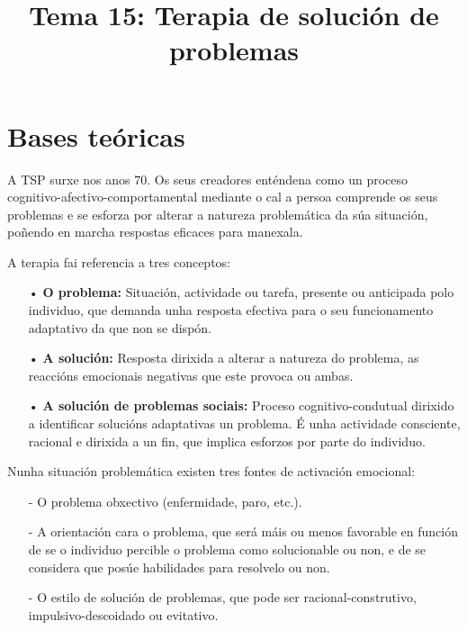 \documentclass[a4paper,11pt]{article}
\title{Tema 15: Terapia de solución de problemas}
\date{}
\begin{document}
   

\maketitle 

\section{Bases teóricas}
A TSP surxe nos anos 70. Os seus creadores enténdena como un proceso cognitivo-afectivo-comportamental mediante o cal a persoa comprende os seus problemas e se esforza por alterar a natureza problemática da súa situación, poñendo en marcha respostas eficaces para manexala.

A terapia fai referencia a tres conceptos:
\begin{itemize}
	\item[•] \textbf{O problema:} Situación, actividade ou tarefa, presente ou anticipada polo 
	individuo, que demanda unha resposta efectiva para o seu funcionamento adaptativo da que non se 
	dispón. 
	\item[•] \textbf{A solución:} Resposta dirixida a alterar a natureza do problema, as reaccións 
	emocionais negativas que este provoca ou ambas.
	\item[•] \textbf{A solución de problemas sociais:} Proceso cognitivo-condutual dirixido a 
	identificar solucións adaptativas un problema. É unha actividade consciente, racional e dirixida 
	a un fin, que implica esforzos por parte do individuo. 
\end{itemize}

Nunha situación problemática existen tres fontes de activación emocional: 
\begin{itemize}
	\item[-] O problema obxectivo (enfermidade, paro, etc.).
	\item[-] A orientación cara o problema, que será máis ou menos favorable en función de se o 
	individuo percible o problema como solucionable ou non, e de se considera que posúe habilidades 
	para resolvelo ou non.
	\item[-] O estilo de solución de problemas, que pode ser racional-construtivo, 
	impulsivo-descoidado ou evitativo. 
\end{itemize}
\end{document}
